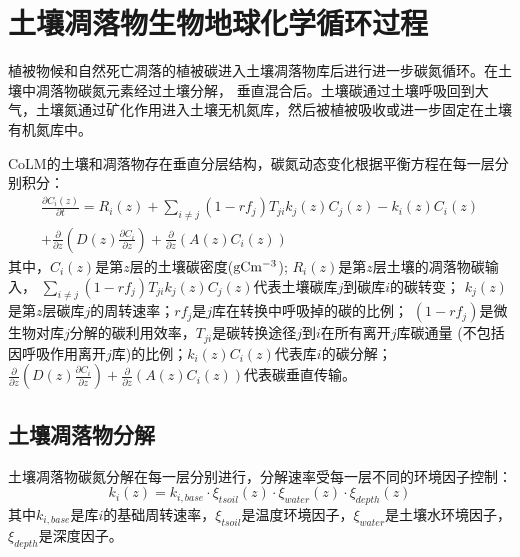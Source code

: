 \chapter{土壤凋落物生物地球化学循环过程}\label{土壤凋落物生物地球化学循环过程}

植被物候和自然死亡凋落的植被碳进入土壤凋落物库后进行进一步碳氮循环。在土壤中凋落物碳氮元素经过土壤分解，
垂直混合后。土壤碳通过土壤呼吸回到大气，土壤氮通过矿化作用进入土壤无机氮库，然后被植被吸收或进一步固定在土壤有机氮库中。

CoLM的土壤和凋落物存在垂直分层结构，碳氮动态变化根据平衡方程在每一层分别积分：
\begin{equation}
\begin{array}{r}\frac{\partial C_{i}(z)}{\partial t}=R_{i}(z)+\sum_{i \neq j}\left(1-r f_{j}\right) T_{j i} k_{j}(z) C_{j}(z)-k_{i}(z) C_{i}(z) \\ +\frac{\partial}{\partial z}\left(D(z) \frac{\partial C_{i}}{\partial z}\right)+\frac{\partial}{\partial z}\left(A(z) C_{i}(z)\right)\end{array}
\end{equation}
其中，$C_i\left(z\right)$是第$z$层的土壤碳密度($\rm gC m^{-3}$); $R_i\left(z\right)$是第$z$层土壤的凋落物碳输入，
$\sum_{i\neq j}{\left(1-{rf}_j\right)T_{ji}k_j\left(z\right)C_j\left(z\right)}$代表土壤碳库$j$到碳库$i$的碳转变；
$k_j\left(z\right)$是第$z$层碳库$j$的周转速率；${rf}_j$是$j$库在转换中呼吸掉的碳的比例；
$\left(1-{rf}_j\right)$是微生物对库$j$分解的碳利用效率，$T_{ji}$是碳转换途径$j$到$i$在所有离开$j$库碳通量
(不包括因呼吸作用离开$j$库)的比例；$k_i\left(z\right)C_i\left(z\right)$代表库$i$的碳分解；
$\frac{\partial}{\partial z}\left(D\left(z\right)\frac{\partial C_i}{\partial z}\right)+\frac{\partial}{\partial z}\left(A\left(z\right)C_i\left(z\right)\right)$代表碳垂直传输。

\section{土壤凋落物分解}\label{土壤凋落物分解}
土壤凋落物碳氮分解在每一层分别进行，分解速率受每一层不同的环境因子控制：
\begin{equation}
k_{i}(z)=k_{i,base} \cdot \xi_{tsoil}(z) \cdot \xi_{water}(z) \cdot \xi_{depth}(z)
\end{equation}
其中$k_{i,base}$是库$i$的基础周转速率，$\xi_{tsoil}$是温度环境因子，$\xi_{water}$是土壤水环境因子，$\xi_{depth}$是深度因子。

